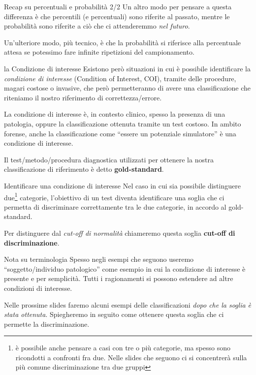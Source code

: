 \documentclass[
  ignorenonframetext,
  aspectratio=169,
]{beamer}
\begin{document}
\begin{frame}{Recap su percentuali e probabilità 2/2}
\label{recap-su-percentuali-e-probabilituxe0-22}
Un altro modo per pensare a questa differenza è che percentili (e
percentuali) sono riferite al passato, mentre le probabilità sono
riferite a ciò che ci attenderemmo \emph{nel futuro}.

Un'ulteriore modo, più tecnico, è che la probabilità si riferisce alla
percentuale attesa se potessimo fare infinite ripetizioni del
campionamento.
\end{frame}

\begin{frame}{la Condizione di interesse}
\label{la-condizione-di-interesse}
Esistono però situazioni in cui è possibile identificare la
\emph{condizione di interesse} (Condition of Interest, COI), tramite
delle procedure, magari costose o invasive, che però permetteranno di
avere una classificazione che riteniamo il nostro riferimento di
correttezza/errore.

La condizione di interesse è, in contesto clinico, spesso la presenza di
una patologia, oppure la classificazione ottenuta tramite un test
costoso. In ambito forense, anche la classificazione come ``essere un
potenziale simulatore'' è una condizione di interesse.

Il test/metodo/procedura diagnostica utilizzati per ottenere la nostra
classificazione di riferimento è detto \textbf{gold-standard}.
\end{frame}

\begin{frame}{Identificare una condizione di interesse}
\label{identificare-una-condizione-di-interesse}
Nel caso in cui sia possibile distinguere
due\footnote{è possibile anche pensare a casi con tre o più categorie, ma spesso sono ricondotti a confronti fra due. Nelle slides che seguono ci si concentrerà sulla più comune discriminazione tra due gruppi}
categorie, l'obiettivo di un test diventa identificare una soglia che ci
permetta di discriminare correttamente tra le due categorie, in accordo
al gold-standard.

Per distinguere dal \emph{cut-off di normalità} chiameremo questa soglia
\textbf{cut-off di discriminazione}.
\end{frame}

\begin{frame}{Nota su terminologia}
\label{nota-su-terminologia}
Spesso negli esempi che seguono useremo ``soggetto/individuo
patologico'' come esempio in cui la condizione di interesse è presente e
per semplicità. Tutti i ragionamenti si possono estendere ad altre
condizioni di interesse.

Nelle prossime slides faremo alcuni esempi delle classificazioni
\emph{dopo che la soglia è stata ottenuta}. Spiegheremo in seguito come
ottenere questa soglia che ci permette la discriminazione.
\end{frame}
\end{document}
